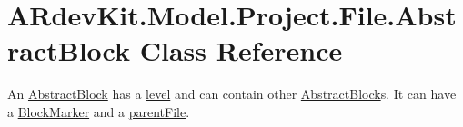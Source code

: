 \hypertarget{class_a_rdev_kit_1_1_model_1_1_project_1_1_file_1_1_abstract_block}{\section{A\-Rdev\-Kit.\-Model.\-Project.\-File.\-Abstract\-Block Class Reference}
\label{class_a_rdev_kit_1_1_model_1_1_project_1_1_file_1_1_abstract_block}
}


An \hyperlink{class_a_rdev_kit_1_1_model_1_1_project_1_1_file_1_1_abstract_block}{Abstract\-Block} has a \hyperlink{class_a_rdev_kit_1_1_model_1_1_project_1_1_file_1_1_abstract_block_a7c07abfe27f2f9104fe7c3d23c7333a5}{level} and can contain other \hyperlink{class_a_rdev_kit_1_1_model_1_1_project_1_1_file_1_1_abstract_block}{Abstract\-Block}s. It can have a \hyperlink{class_a_rdev_kit_1_1_model_1_1_project_1_1_file_1_1_block_marker}{Block\-Marker} and a \hyperlink{class_a_rdev_kit_1_1_model_1_1_project_1_1_file_1_1_abstract_block_a7dd07d5a865359c764a8cdab272a0662}{parent\-File}.  




